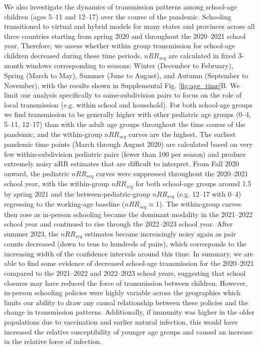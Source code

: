 \documentclass[11pt, letterpaper, oneside]{article}
\begin{document}
We also investigate the dynamics of transmission patterns among school-age children (ages 5--11 and 12--17) over the course of the pandemic.
Schooling transitioned to virtual and hybrid models for many states and provinces across all three countries starting from spring 2020 and throughout the 2020--2021 school year.\autocite{COVID19ProvincialPolicies, DataResourcesCOVID19, boruchowiczTimeUseYouth2022}
Therefore, we assess whether within group transmission for school-age children decreased during these time periods.
$nRR_{seq}$ are calculated in fixed 3-month windows corresponding to seasons: Winter (December to February), Spring (March to May), Summer (June to August), and Autumn (September to November), with the results shown in Supplemental Fig. \ref{fig:age_time}B.
We limit our analysis specifically to same-subdivision pairs to focus on the role of local transmission (e.g. within school and household).
For both school-age groups we find transmission to be generally higher with other pediatric age groups (0--4, 5--11, 12--17) than with the adult age groups throughout the time course of the pandemic, and the within-group $nRR_{seq}$ curves are the highest.
The earliest pandemic time points (March through August 2020) are calculated based on very few within-subdivision pediatric pairs (fewer than 100 per season) and produce extremely noisy nRR estimates that are difficult to interpret.
From Fall 2020 onward, the pediatric $nRR_{seq}$ curves were suppressed throughout the 2020--2021 school year, with the within-group $nRR_{seq}$ for both school-age groups around 1.5 by spring 2021 and the between-pediatric-group $nRR_{seq}$ (e.g. 12--17 with 0--4) regressing to the working-age baseline ($nRR_{seq} \approx 1$).
The within-group curves then rose as in-person schooling became the dominant modality in the 2021--2022 school year and continued to rise through the 2022--2023 school year.
After summer 2023, the $nRR_{seq}$ estimates became increasingly noisy again as pair counts decreased (down to tens to hundreds of pairs), which corresponds to the increasing width of the confidence intervals around this time.
In summary, we are able to find some evidence of decreased school-age transmission for the 2020--2021 compared to the 2021--2022 and 2022--2023 school years, suggesting that school closures may have reduced the force of transmission between children.
However, in-person schooling policies were highly variable across the geographies which limits our ability to draw any causal relationship between these policies and the change in transmission patterns.
Additionally, if immunity was higher in the older populations due to vaccination and earlier natural infection, this would have increased the relative susceptibility of younger age groups and caused an increase in the relative force of infection.
\end{document}
